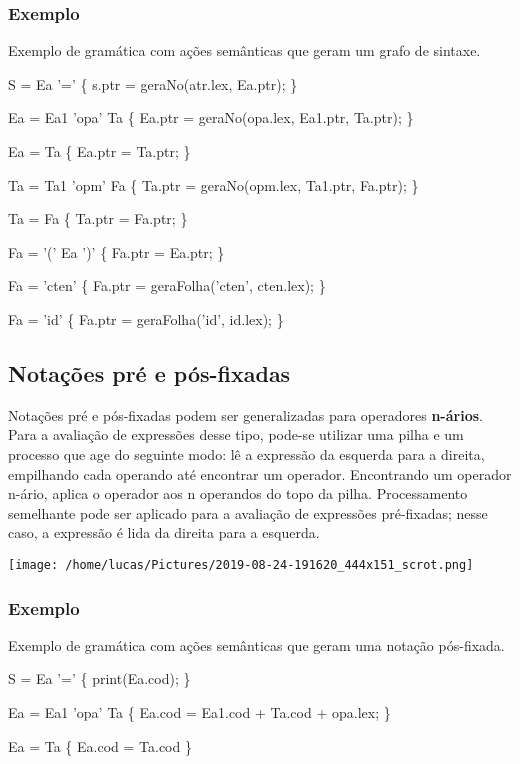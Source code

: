 \documentclass[11pt]{article}
\begin{document}
\subsubsection{Exemplo}
\label{sec:org9ca8ea1}
Exemplo de gramática com ações semânticas que geram um grafo de
sintaxe.

S = Ea '=' \{ s.ptr = geraNo(atr.lex, Ea.ptr); \}

Ea = Ea1 'opa' Ta \{ Ea.ptr = geraNo(opa.lex, Ea1.ptr, Ta.ptr); \}

Ea = Ta \{ Ea.ptr = Ta.ptr; \}

Ta = Ta1 'opm' Fa \{ Ta.ptr = geraNo(opm.lex, Ta1.ptr, Fa.ptr); \}

Ta = Fa \{ Ta.ptr = Fa.ptr; \}

Fa = '(' Ea ')' \{ Fa.ptr = Ea.ptr; \}

Fa = 'cten' \{ Fa.ptr = geraFolha('cten', cten.lex); \}

Fa = 'id' \{ Fa.ptr = geraFolha('id', id.lex); \}


\subsection{Notações pré e pós-fixadas}
\label{sec:org38db099}
Notações pré e pós-fixadas podem ser generalizadas para operadores
\textbf{n-ários}. Para a avaliação de expressões desse tipo, pode-se
utilizar uma pilha e um processo que age do seguinte modo: lê a
expressão da esquerda para a direita, empilhando cada operando até
encontrar um operador. Encontrando um operador n-ário, aplica o
operador aos n operandos do topo da pilha. Processamento semelhante
pode ser aplicado para a avaliação de expressões pré-fixadas; nesse
caso, a expressão é lida da direita para a esquerda.

\begin{center}
\texttt{[image: /home/lucas/Pictures/2019-08-24-191620\_444x151\_scrot.png]}
\end{center}

\subsubsection{Exemplo}
\label{sec:org5d9097a}
Exemplo de gramática com ações semânticas que geram uma notação
pós-fixada.

S = Ea '=' \{ print(Ea.cod); \}

Ea = Ea1 'opa' Ta \{ Ea.cod = Ea1.cod + Ta.cod + opa.lex; \}

Ea = Ta \{ Ea.cod = Ta.cod \}
\end{document}
